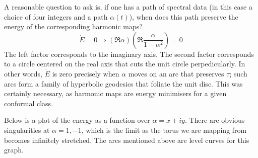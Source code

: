 A reasonable question to ask is, if one has a path of spectral data (in this case a choice of four integers and a path $\alpha(t)$), when does this path preserve the energy of the corresponding harmonic maps?
\[
\dot E = 0 \Rightarrow \left(\Re \alpha\right)\left( \Re \frac{\dot \alpha}{1-\alpha^2} \right) = 0
\]
The left factor corresponds to the imaginary axis. The second factor corresponds to a circle centered on the real axis that cuts the unit circle perpedicularly. In other words, $\dot E$ is zero precisely when $\alpha$ moves on an arc that preserves $\tau$; such arcs form a family of hyperbolic geodesics that foliate the unit disc. This was certainly necessary, as harmonic maps are energy minimisers for a given conformal class.

Below is a plot of the energy as a function over $\alpha = x + i y$. There are obvious singularities at $\alpha=1,-1$, which is the limit as the torus we are mapping from becomes infinitely stretched. The arcs mentioned above are level curves for this graph.

\begin{center}
\end{center}

